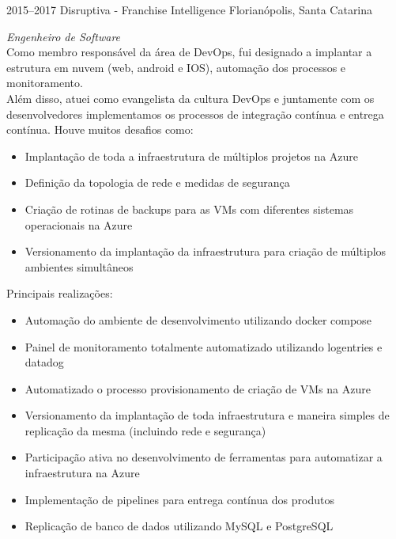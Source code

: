 \documentclass[]{friggeri-cv} %
\begin{document}
\begin{entrylist}
\entry
{2015--2017}
{Disruptiva - Franchise Intelligence}
{Florianópolis, Santa Catarina}
{\emph{Engenheiro de Software} \\

    Como membro responsável da área de DevOps, fui designado a implantar a estrutura em nuvem
    (web, android e IOS), automação dos processos e monitoramento. \\
    Além disso, atuei como evangelista da cultura DevOps e juntamente com os desenvolvedores implementamos 
    os processos de integração contínua e entrega contínua. 
    Houve muitos desafios como:\\

\begin{itemize}
    \item Implantação de toda a infraestrutura de múltiplos projetos na Azure
    \item Definição da topologia de rede e medidas de segurança
    \item Criação de rotinas de backups para as VMs com diferentes sistemas operacionais na Azure
    \item Versionamento da implantação da infraestrutura para criação de múltiplos ambientes simultâneos
\end{itemize}

Principais realizações:

\begin{itemize}
    \item Automação do ambiente de desenvolvimento utilizando docker compose
    \item Painel de monitoramento totalmente automatizado utilizando logentries e datadog
    \item Automatizado o processo provisionamento de criação de VMs na Azure
    \item Versionamento da implantação de toda infraestrutura e maneira simples de replicação da mesma (incluindo rede e segurança)
    \item Participação ativa no desenvolvimento de ferramentas para automatizar a infraestrutura na Azure
    \item Implementação de pipelines para entrega contínua dos produtos
    \item Replicação de banco de dados utilizando MySQL e PostgreSQL
\end{itemize}
}
\end{entrylist}
\end{document}
